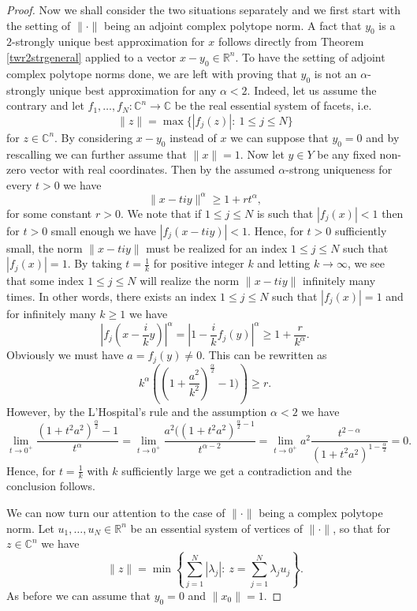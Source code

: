\documentclass[12pt, reqno]{amsart}
\theoremstyle{definition}
\theoremstyle{remark}
\numberwithin{equation}{section}
\begin{document}
\begin{proof}
Now we shall consider the two situations separately and we first start with the setting of $\| \cdot \|$ being an adjoint complex polytope norm. A fact that $y_0$ is a $2$-strongly unique best approximation for $x$ follows directly from Theorem \ref{twr2strgeneral} applied to a vector $x-y_0 \in \mathbb{R}^n$. To have the setting of adjoint complex polytope norms done, we are left with proving that $y_0$ is not an $\alpha$-strongly unique best approximation for any $\alpha<2$. Indeed, let us assume the contrary and let $f_1, \ldots, f_N: \mathbb{C}^n \to \mathbb{C}$ be the real essential system of facets, i.e.
$$\|z\| = \max \{|f_j(z)|: \ 1 \leq j \leq N\}$$
for $z \in \mathbb{C}^n$. By considering $x-y_0$ instead of $x$ we can suppose that $y_0=0$ and by rescalling we can further assume that $\|x\|=1$. Now let $y \in Y$ be any fixed non-zero vector with real coordinates. Then by the assumed $\alpha$-strong uniqueness for every $t > 0$ we have
$$\|x-tiy\|^{\alpha} \geq 1 + rt^{\alpha},$$
for some constant $r>0$. We note that if $1 \leq j \leq N$ is such that $|f_j(x)|<1$ then for $t>0$ small enough we have $|f_j(x-tiy)|<1$. Hence, for $t>0$ sufficiently small, the norm $\|x-tiy\|$ must be realized for an index $1 \leq j \leq N$ such that $|f_j(x)|=1$. By taking $t=\frac{1}{k}$ for positive integer $k$ and letting $k \to \infty$, we see that some index $1 \leq j \leq N$ will realize the norm $\|x-tiy\|$ infinitely many times. In other words, there exists an index $1 \leq j \leq N$ such that $|f_j(x)|=1$ and for infinitely many $k \geq 1$ we have
$$\left |f_j\left ( x-\frac{i}{k}y \right ) \right |^{\alpha} = \left | 1 - \frac{i}{k}f_j(y) \right |^{\alpha} \geq 1 + \frac{r}{k^{\alpha}}.$$
Obviously we must have $a=f_j(y) \neq 0$. This can be rewritten as
$$k^{\alpha}\left ( \left ( 1 + \frac{a^2}{k^2} \right )^{\frac{\alpha}{2}} - 1) \right ) \geq r.$$
However, by the L'Hospital's rule and the assumption $\alpha<2$ we have
$$\lim_{t \to 0^+} \frac{\left ( 1 + t^2a^2 \right )^{\frac{\alpha}{2}} - 1}{t^{\alpha}} = \lim_{t \to 0^+} \frac{a^2(\left ( 1 + t^2a^2 \right )^{\frac{\alpha}{2}-1}}{t^{\alpha-2}} = \lim_{t \to 0^+} a^2 \frac{t^{2-\alpha}}{\left ( 1 + t^2a^2 \right )^{1-\frac{\alpha}{2}}} =0.$$
Hence, for $t=\frac{1}{k}$ with $k$ sufficiently large we get a contradiction and the conclusion follows.


We can now turn our attention to the case of $\| \cdot \|$ being a complex polytope norm. Let $u_1, \ldots, u_N \in \mathbb{R}^n$ be an essential system of vertices of $\| \cdot \|$, so that for $z \in \mathbb{C}^n$ we have
$$\|z\| = \min \left \{ \sum_{j=1}^{N} |\lambda_j|: \ z = \sum_{j=1}^{N} \lambda_j u_j \right \}.$$
As before we can assume that $y_0=0$ and $\|x_0\|=1$.


\end{proof}
\end{document}
